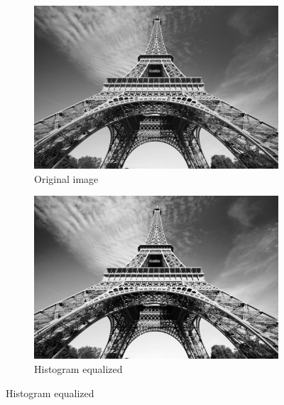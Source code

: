 \documentclass[12pt]{article}
\begin{document}
\begin{figure}[H]
  \centering
  \begin{subfigure}{.45\textwidth}
    \includegraphics[width=\linewidth]{./img/in.jpg}
    \caption{Original image}
  \end{subfigure}
  \hspace{1cm}
  \begin{subfigure}{.45\textwidth}
    \includegraphics[width=\linewidth]{./img/out.jpg}
    \caption{Histogram equalized}
  \end{subfigure}
\end{figure}


\end{document}
